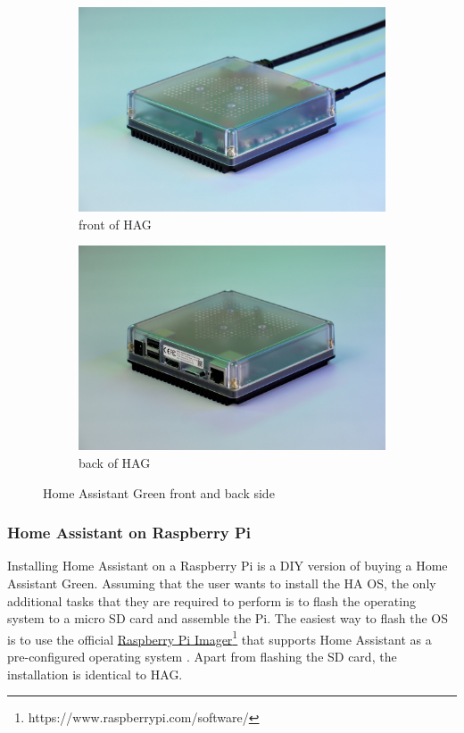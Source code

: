 \begin{figure}[H]
    \centering
    \begin{subfigure}{.5\textwidth}
        \raggedright
        \includegraphics[width=.975\linewidth]{img/ha-green-photo-front.jpg}
        \caption{front of HAG \cite{HomeAssistant_HAG}}
    \end{subfigure}%
    \begin{subfigure}{.5\textwidth}
        \raggedleft
        \includegraphics[width=.975\linewidth]{img/ha-green-photo-back.jpg}
        \caption{back of HAG \cite{HomeAssistant_HAG}}
    \end{subfigure}
    \caption{Home Assistant Green front and back side}
    \label{fig:HAG_front&back}
\end{figure}

\newpage

\subsubsection{Home Assistant on Raspberry Pi}
Installing Home Assistant on a Raspberry Pi is a DIY version of buying a Home Assistant Green. Assuming that the user wants to install the HA OS, the only additional tasks that they are required to perform is to flash the operating system to a micro SD card and assemble the Pi. The easiest way to flash the OS is to use the official \href{https://www.raspberrypi.com/software/}{Raspberry Pi Imager}\footnote{https://www.raspberrypi.com/software/} that supports Home Assistant as a pre-configured operating system \cite{HomeAssistant_Installation_Pi}. Apart from flashing the SD card, the installation is identical to HAG.

